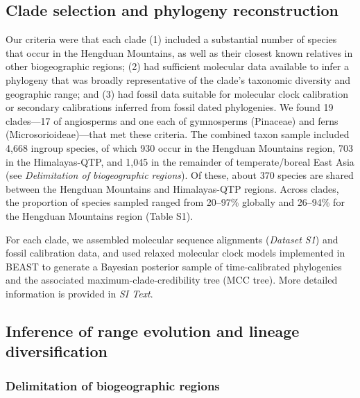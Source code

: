 
\subsection*{Clade selection and phylogeny reconstruction}

Our criteria were that each clade (1) included a substantial number of
species that occur in the Hengduan Mountains, as well as their closest
known relatives in other biogeographic regions; (2) had sufficient
molecular data available to infer a phylogeny that was broadly
representative of the clade's taxonomic diversity and geographic
range; and (3) had fossil data suitable for molecular clock
calibration or secondary calibrations inferred from fossil dated
phylogenies. We found 19 clades---17 of angiosperms and one each of
gymnosperms (Pinaceae) and ferns (Microsorioideae)---that met these
criteria. The combined taxon sample included 4,668 ingroup species, of
which 930 occur in the Hengduan Mountains region, 703 in the
Himalayas-QTP, and 1,045 in the remainder of temperate/boreal East
Asia (see \textit{Delimitation of biogeographic regions}). Of these,
about 370 species are shared between the Hengduan Mountains and
Himalayas-QTP regions. Across clades, the proportion of species
sampled ranged from 20--97\% globally and 26--94\% for the Hengduan
Mountains region (Table S1).

For each clade, we assembled molecular sequence alignments
(\textit{Dataset S1}) and fossil calibration data, and used relaxed
molecular clock models implemented in BEAST
\citep{Drummond2012,Bouckaert2014} to generate a Bayesian posterior
sample of time-calibrated phylogenies and the associated
maximum-clade-credibility tree (MCC tree).  More detailed information
is provided in \textit{SI Text}.


\subsection*{Inference of range evolution and lineage diversification}

\subsubsection*{Delimitation of biogeographic regions}

